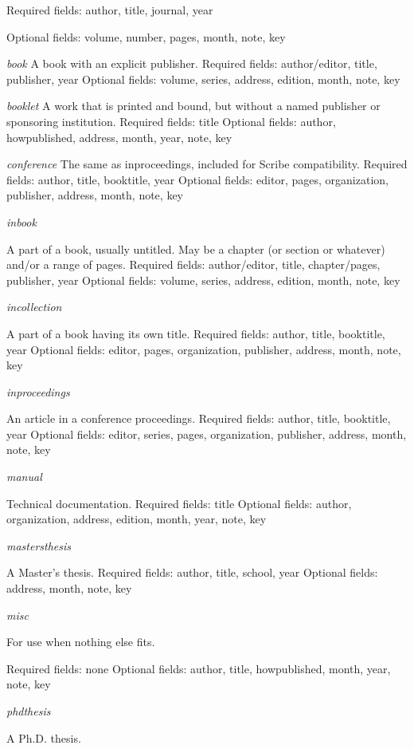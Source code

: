 \begin{refsection}
  Required fields: author, title, journal, year

  Optional fields: volume, number, pages, month, note, key

\emph{book}
   A book with an explicit publisher.
   Required fields: author/editor, title, publisher, year
   Optional fields: volume, series, address, edition, month, note, key

\emph{booklet}
   A work that is printed and bound, but without a named publisher or sponsoring institution.
   Required fields: title
   Optional fields: author, howpublished, address, month, year, note, key

\emph{conference}
   The same as inproceedings, included for Scribe compatibility.
   Required fields: author, title, booktitle, year
   Optional fields: editor, pages, organization, publisher, address, month, note, key

\emph{inbook}

    A part of a book, usually untitled. May be a chapter (or section or whatever) and/or a range of pages.
    Required fields: author/editor, title, chapter/pages, publisher, year
    Optional fields: volume, series, address, edition, month, note, key

\emph{incollection}

    A part of a book having its own title.
    Required fields: author, title, booktitle, year
    Optional fields: editor, pages, organization, publisher, address, month, note, key

\emph{inproceedings}

An article in a conference proceedings.
Required fields: author, title, booktitle, year
Optional fields: editor, series, pages, organization, publisher, address, month, note, key

\emph{manual}

Technical documentation.
Required fields: title
Optional fields: author, organization, address, edition, month, year, note, key

\emph{mastersthesis}

A Master's thesis.
Required fields: author, title, school, year
Optional fields: address, month, note, key

\emph{misc}

For use when nothing else fits.

Required fields: none
Optional fields: author, title, howpublished, month, year, note, key

\emph{phdthesis}

A Ph.D. thesis.


\end{refsection}
